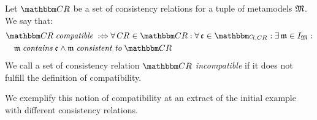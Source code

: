 \begin{definition}[Compatibility] \label{def:compatibility}
    Let $\consistencyrelationset{CR}$ be a set of consistency relations for a tuple of metamodels $\metamodeltuple{M}$. %
    We say that:
    \begin{align*}
        &
        \consistencyrelationset{CR} \compatiblemath \equivalentperdefinition %
        \forall \consistencyrelation{CR}{} \in \consistencyrelationset{CR} : \forall \conditionelement{c}{} \in \condition{c}{l, \consistencyrelation{CR}{}} %
        : \exists \modeltuple{m} \in \metamodeltupleinstanceset{M} : \\
        & \formulaskip %
        \modeltuple{m} \containsmath \conditionelement{c}{} \land \modeltuple{m} \consistenttomath \consistencyrelationset{CR}
    \end{align*}
    We call a set of consistency relation $\consistencyrelationset{CR}$ \emph{incompatible} if it does not fulfill the definition of compatibility.
\end{definition}

We exemplify this notion of compatibility at an extract of the initial example with different consistency relations.

